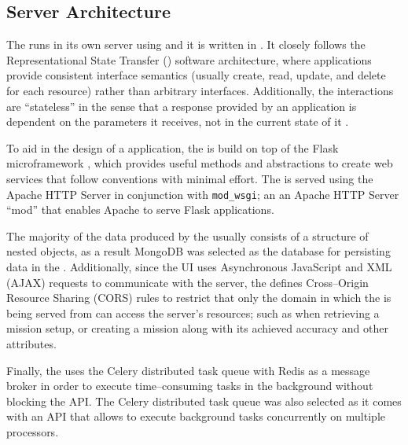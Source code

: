 \subsection{Server Architecture} \label{subsect:case-study:arch:server}

The \mlblinkapi runs in its own server using \ubuntu and it is written in \python. It closely follows the Representational State Transfer (\rest) software architecture, where applications provide consistent interface semantics (usually create, read, update, and delete for each resource) rather than arbitrary interfaces. Additionally, the \rest interactions are ``stateless'' in the sense that a response provided by an application is dependent on the parameters it receives, not in the current state of it \cite{web:w3:rest}.

To aid in the design of a \rest application, the \mlblinkapi is build on top of the Flask microframework \cite{software:flask}, which provides useful methods and abstractions to create web services that follow \rest conventions with minimal effort. The \mlblinkapi is served using the Apache HTTP Server in conjunction with \texttt{mod\_wsgi}; an an Apache HTTP Server ``mod'' that enables Apache to serve Flask applications.

The majority of the data produced by the \mlblinkui usually consists of a structure of nested objects, as a result MongoDB was selected as the database for persisting data in the \mlblinkapi. Additionally, since the UI uses Asynchronous JavaScript and XML (AJAX) requests to communicate with the server, the \mlblinkapi defines Cross--Origin Resource Sharing (CORS) rules to restrict that only the domain in which the \mlblinkui is being served from can access the server's resources; such as when retrieving a mission setup, or creating a mission along with its achieved accuracy and other attributes.

Finally, the \mlblinkapi uses the Celery distributed task queue \cite{software:celery} with Redis as a message broker in order to execute time--consuming tasks in the background without blocking the API. The Celery distributed task queue was also selected as it comes with an API that allows to execute background tasks concurrently on multiple processors.